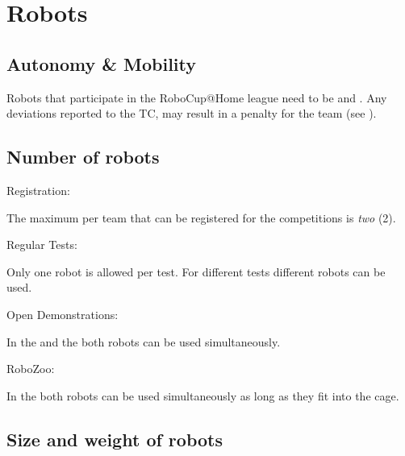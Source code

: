 \section{Robots}
\label{rule:robots}

\subsection{Autonomy \& Mobility}
Robots that participate in the RoboCup@Home league need to be  and . Any deviations reported to the TC, may result in a penalty for the team (see ).


\subsection{Number of robots}
\label{rule:robots_number}

\begin{enumerate}
	{\bf\item Registration:} The maximum  per team that can be registered for the competitions is \emph{two} (2).
	{\bf\item Regular Tests:} Only one robot is allowed per test. For different tests different robots can be used.
	{\bf\item Open Demonstrations:} In the  and the  both robots can be used simultaneously.
	{\bf\item RoboZoo:} In the  both robots can be used simultaneously as long as they fit into the cage.
\end{enumerate}


\subsection{Size and weight of robots}
\label{rule:robots_size}

